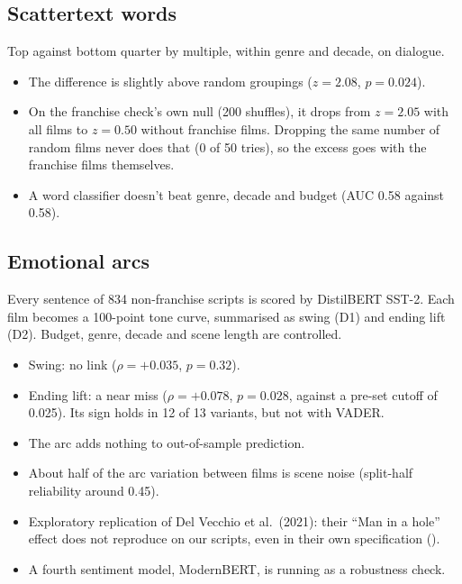 \documentclass[10pt]{article}
\begin{document}
\subsection{Scattertext words }
Top against bottom quarter by multiple, within genre and decade, on dialogue.
\begin{itemize}
  \item The difference is slightly above random groupings ($z = 2.08$, $p = 0.024$).
  \item On the franchise check's own null (200 shuffles), it drops from $z = 2.05$ with all films to $z = 0.50$ without franchise films. Dropping the same number of random films never does that (0 of 50 tries), so the excess goes with the franchise films themselves.
  \item A word classifier doesn't beat genre, decade and budget (AUC 0.58 against 0.58).
\end{itemize}

\subsection{Emotional arcs }
Every sentence of 834 non-franchise scripts is scored by DistilBERT SST-2. Each film becomes a 100-point tone
curve, summarised as swing (D1) and ending lift (D2). Budget, genre, decade and scene length are controlled.
\begin{itemize}
  \item Swing: no link ($\rho = +0.035$, $p = 0.32$).
  \item Ending lift: a near miss ($\rho = +0.078$, $p = 0.028$, against a pre-set cutoff of 0.025). Its sign holds in 12 of 13 variants, but not with VADER.
  \item The arc adds nothing to out-of-sample prediction.
  \item About half of the arc variation between films is scene noise (split-half reliability around 0.45).
  \item Exploratory replication of Del Vecchio et al.\ (2021): their ``Man in a hole'' effect does not reproduce on our scripts, even in their own specification ().
  \item A fourth sentiment model, ModernBERT, is running as a robustness check.
\end{itemize}
\end{document}

